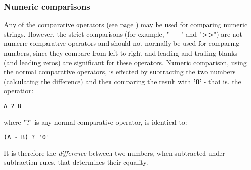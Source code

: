 \subsubsection{Numeric comparisons}\label{arithnumericcomparisons}
 Any of the  comparative operators (see page \pageref{refcomps})  may be used
for comparing numeric strings.
However, the strict comparisons (for example, "\textbf{==}" and
"\textbf{>{}>}") are not numeric comparative operators and should
not normally be used for comparing numbers, since they compare from left
to right and leading and trailing blanks (and leading zeros) are
significant for these operators.
 Numeric comparison, using the normal comparative operators, is
effected by subtracting the two numbers (calculating the difference) and
then comparing the result with \textbf{'0'} - that is, the
operation:
\begin{lstlisting}
A ? B
\end{lstlisting}
where "\textbf{?}" is any normal comparative operator, is
identical to:
\begin{lstlisting}
(A - B) ? '0'
\end{lstlisting}
It is therefore the \emph{difference} between two numbers, when
subtracted under \nr{} subtraction rules, that determines their equality.
